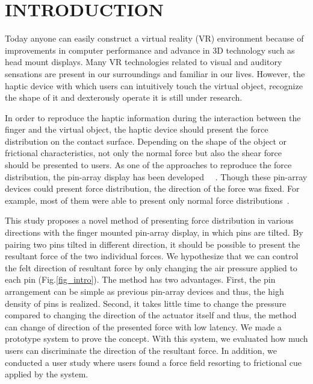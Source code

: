 \section{INTRODUCTION}
Today anyone can easily construct a virtual reality (VR) environment because of improvements in computer performance and advance in 3D technology such as head mount displays. 
Many VR technologies related to visual and auditory sensations are present in our surroundings and familiar in our lives.
However, the haptic device with which users can intuitively touch the virtual object, recognize the shape of it and dexterously operate it is still under research.

In order to reproduce the haptic information during the interaction between the finger and the virtual object, the haptic device should present the force distribution on the contact surface.
Depending on the shape of the object or frictional characteristics, not only the normal force but also the shear force should be presented to users.
As one of the approaches to reproduce the force distribution, the pin-array display has been developed ~\cite{Shimizu1993}~\cite{Koo2008}.
Though these pin-array devices could present force distribution, the direction of the force was fixed.
For example, most of them were able to present only normal force distributions~\cite{Moy2000,Velazquez2005,Sarakoglou2005,Kim2009}.


This study proposes a novel method of presenting force distribution in various directions with the finger mounted pin-array display, in which pins are tilted.
By pairing two pins tilted in different direction, it should be possible to present the resultant force of the two individual forces.
We hypothesize that we can control the felt direction of resultant force by only changing the air pressure applied to each pin (Fig.\ref{fig_intro}).
The method has two advantages.
First, the pin arrangement can be simple as previous pin-array devices and thus, the high density of pins is realized.
Second, it takes little time to change the pressure compared to changing the direction of the actuator itself and thus, the method can change of direction of the presented force with low latency.
We made a prototype system to prove the concept.
With this system, we evaluated how much users can discriminate the direction of the resultant force.
In addition, we conducted a user study where users found a force field resorting to frictional cue applied by the system.


